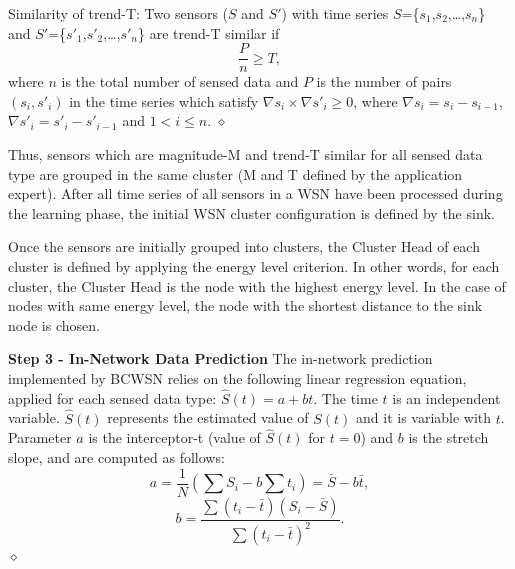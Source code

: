 \documentclass{acm_proc_article-sp}
\newcommand{\dia}{\hspace*{.1cm} \hfill $\diamond$}
\begin{document}
\begin{defini}
Similarity of trend-T: Two sensors ($S$ and $S'$) with time series
$S$=\{$s_{1}$,$s_{2}$,\ldots,$s_{n}$\} and
$S'$=\{$s'_{1}$,$s'_{2}$,\ldots,$s'_{n}$\} are trend-T similar if 
\begin{equation}
\label{equ:trend}
\frac{P}{n} \geq T,
\end{equation}
where $n$ is the total number of sensed data and $P$ is the number of pairs
$(s_{i},s'_{i})$ in the time series which satisfy $\nabla s_{i} \times \nabla
s'_{i} \geq 0$, where $\nabla s_{i} = s_{i} - s_{i-1}$, $\nabla
s'_{i} = s'_{i} - s'_{i-1}$ and $1 < i \leq n$.
\dia
\end{defini}
\vspace*{-.5cm}

Thus, sensors which are magnitude-M and trend-T similar for all sensed data type
are grouped in the same cluster (M and T defined by the application expert).
After all time series of all sensors in a WSN have been processed during the
learning phase, the initial WSN cluster configuration is defined by the sink.
\vspace*{-.3cm}

Once the sensors are initially grouped into clusters, the Cluster Head of each
cluster is defined by applying the energy level criterion.
In other words, for each cluster, the Cluster Head is the node with the highest
energy level. In the case of nodes with same energy level, the node with the
shortest distance to the sink node is chosen.
\vspace*{-.3cm}

{\bf Step 3 - In-Network Data Prediction}
The in-network prediction implemented by BCWSN relies on the
following linear regression equation, applied for each sensed data type:
$\hat{S}(t) = a + bt$.
The time $t$ is an independent variable. $\hat{S}(t)$ represents the estimated
value of $S(t)$ and it is variable with $t$. Parameter $a$ is the interceptor-t
(value of $\hat{S}(t)$ for $t=0$) and $b$ is the stretch slope, and are computed
as follows:
\begin{equation}
\label{coef-a}
	a = \frac{1}{N}\left(\sum S_{i} - b\sum t_{i} \right) = \bar{S} - b\bar{t},
\end{equation}
\vspace*{-.3cm}
\begin{equation}
\label{coef-b}
	b = \frac{\sum \left(t_{i} - \bar{t}\right)\left(S_{i} - \bar{S}\right)}{\sum \left(t_{i} - \bar{t}\right)^{2}}.
\end{equation}
	\dia
\vspace*{-.4cm}
\end{document}
